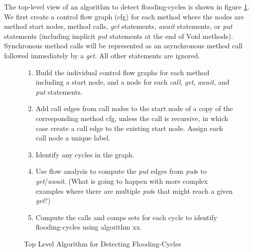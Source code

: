 \documentclass[12pt]{article}%
\begin{document}

The top-level view of an algorithm to detect flooding-cycles is shown in figure \ref{flow-analysis}.
We first create a control flow graph (cfg) for each method where the nodes are method start nodes, method calls, \emph{get} statements, 
\emph{await} statements,
or \emph{put} statements (including implicit \emph{put} statements at the end of Void methods). %
Synchronous method calls will be represented as an asynchronous method call followed immediately by a \emph{get}.
All other statements are ignored. 

\begin{figure}
\begin{shaded}
\begin{enumerate}
\item Build the individual control flow graphs for each method including a start node, and a node for each \emph{call}, \emph{get}, \emph{await}, 
and \emph{put} statements.
\item Add call edges from call nodes to the start node of a copy of the corresponding method cfg, unless the call is recursive, in which case
create a call edge to the existing start node. Assign each call node a unique label.
\item Identify any cycles in the graph.
\item Use flow analysis to compute the \emph{put} edges from \emph{put}s to \emph{get}/\emph{await}. (What is going to happen with more complex examples
where there are multiple \emph{put}s that might reach a given \emph{get}?)
\item Compute the calls and comps sets for each cycle to identify flooding-cycles using algorithm xx.
\end{enumerate}\end{shaded}%
\caption{\label{flow-analysis}
Top Level Algorithm for Detecting Flooding-Cycles}
\end{figure}
\end{document}
